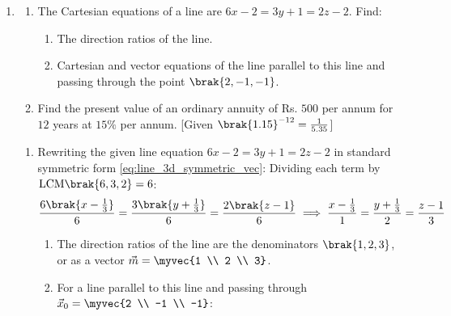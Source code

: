 \begin{enumerate}[label=\thesubsection.\arabic*, ref=\thesubsection.\theenumi]
\begin{enumerate}[label=\brak{\alph*}]
		\begin{align}
			y\brak{x} = \frac{x^2}{2}\log x - \frac{3x^2}{4} + 2x - \frac{1}{4}, \quad x \ge 1
		\end{align}
		\item Constructing cumulative frequency ($N = 75$):
		Quartile positions give $Q_1 = 15, Q_2 = 20, Q_3 = 30$.
		From \eqref{eq:bowley_skewness}, Bowley's coefficient is:
		\begin{align}
			S_b = \frac{30 + 15 - 40}{30 - 15} = \frac{5}{15} = \frac{1}{3} \approx 0.333
		\end{align}
	\end{enumerate}
	
	\item \hfill {}
	\begin{enumerate}[label=\brak{\alph*}]
		\item The Cartesian equations of a line are $6x - 2 = 3y + 1 = 2z - 2$. Find:
		\begin{enumerate}[label=\brak{\roman*}]
			\item The direction ratios of the line.
			\item Cartesian and vector equations of the line parallel to this line and passing through the point $\brak{2, -1, -1}$.
		\end{enumerate}
		\item Find the present value of an ordinary annuity of Rs. $500$ per annum for $12$ years at $15\%$ per annum. [Given $\brak{1.15}^{-12} = \frac{1}{5.35}$]
	\end{enumerate}
	\solution
	\begin{enumerate}[label=\brak{\alph*}]
		\item Rewriting the given line equation $6x - 2 = 3y + 1 = 2z - 2$ in standard symmetric form \eqref{eq:line_3d_symmetric_vec}:
		Dividing each term by $\text{LCM}\brak{6, 3, 2} = 6$:
		\begin{align}
			\frac{6\brak{x - \frac{1}{3}}}{6} = \frac{3\brak{y + \frac{1}{3}}}{6} = \frac{2\brak{z - 1}}{6} \implies \frac{x - \frac{1}{3}}{1} = \frac{y + \frac{1}{3}}{2} = \frac{z - 1}{3}
		\end{align}
		\begin{enumerate}[label=\brak{\roman*}]
			\item The direction ratios of the line are the denominators $\brak{1, 2, 3}$, or as a vector $\vec{m} = \myvec{1 \\ 2 \\ 3}$.
			\item For a line parallel to this line and passing through $\vec{x}_0 = \myvec{2 \\ -1 \\ -1}$:

\end{enumerate}
\end{enumerate}
\end{enumerate}
